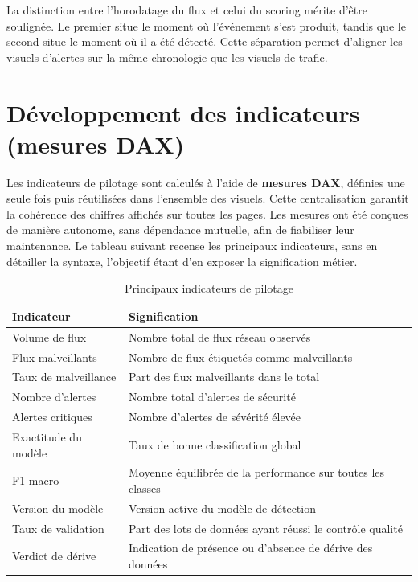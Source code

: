 \documentclass[12pt,a4paper,oneside]{report}
\begin{document}
La distinction entre l'horodatage du flux et celui du scoring mérite d'être soulignée. Le premier situe le moment où l'événement s'est produit, tandis que le second situe le moment où il a été détecté. Cette séparation permet d'aligner les visuels d'alertes sur la même chronologie que les visuels de trafic.

\section{Développement des indicateurs (mesures DAX)}
Les indicateurs de pilotage sont calculés à l'aide de \textbf{mesures DAX}, définies une seule fois puis réutilisées dans l'ensemble des visuels. Cette centralisation garantit la cohérence des chiffres affichés sur toutes les pages. Les mesures ont été conçues de manière autonome, sans dépendance mutuelle, afin de fiabiliser leur maintenance. Le tableau suivant recense les principaux indicateurs, sans en détailler la syntaxe, l'objectif étant d'en exposer la signification métier.

\begin{table}[h]
\centering
\caption{Principaux indicateurs de pilotage}
\begin{tabularx}{\textwidth}{lX}
\toprule
\textbf{Indicateur} & \textbf{Signification} \\
\midrule
Volume de flux & Nombre total de flux réseau observés \\
Flux malveillants & Nombre de flux étiquetés comme malveillants \\
Taux de malveillance & Part des flux malveillants dans le total \\
Nombre d'alertes & Nombre total d'alertes de sécurité \\
Alertes critiques & Nombre d'alertes de sévérité élevée \\
Exactitude du modèle & Taux de bonne classification global \\
F1 macro & Moyenne équilibrée de la performance sur toutes les classes \\
Version du modèle & Version active du modèle de détection \\
Taux de validation & Part des lots de données ayant réussi le contrôle qualité \\
Verdict de dérive & Indication de présence ou d'absence de dérive des données \\
\bottomrule
\end{tabularx}
\end{table}
\end{document}
